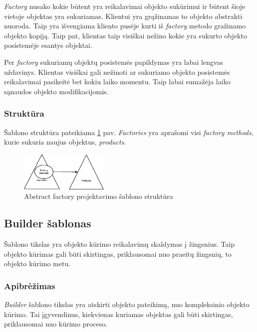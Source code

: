 \documentclass[10pt]{IEEEtran}
\begin{document}
				\textit{Factory} nusako kokie būtent yra reikalavimai objekto sukūrimui ir būtent šioje vietoje objektas yra sukuriamas. Klientui yra grąžinamas to objekto abstrakti nuoroda. Taip yra išvengiama kliento pusėje kurti iš \textit{factory} metodo gražinamo objekto kopiją. Taip pat, klientas taip visiškai nežino kokie yra sukurto objekto posistemėje esantys objektai.

				Per \textit{factory} sukuriamų objektų posistemės papildymas yra labai lengvas uždavinys. Klientas visiškai gali nežinoti ar sukuriamo objekto posistemės reikalavimai pasikeitė bet kokiu laiko momentu. Taip labai sumažėja laiko sąnaudos objekto modifikacijomis.

			\subsubsection{Struktūra}

				Šablono struktūra pateikiama \ref{fig:abstract_factory_pattern} pav. \textit{Factories} yra aprašomi visi \textit{factory methods}, kurie sukuria naujus objektus, \textit{products}.

				\begin{figure}[t]
					\centering
					\includegraphics[width=160px]{diagrams/abstract_factory_pattern.eps}
					\caption{Abstract factory projektavimo šablono struktūra}
					\label{fig:abstract_factory_pattern}
				\end{figure}

		\subsection{Builder šablonas}

			Šablono tikslas yra objekto kūrimo reikalavimų skaldymas į žingsnius. Taip objekto kūrimas gali būti skirtingas, priklausomai nuo praeitų žingsnių, to objekto kūrimo metu.

			\subsubsection{Apibrėžimas}

				\textit{Builder} šablono tikslas yra atskirti objekto pateikimą, nuo kompleksinio objekto kūrimo. Tai įgyvendinus, kiekvienas kuriamas objektas gali būti skirtingas, priklausomai nuo kūrimo proceso.
\end{document}
